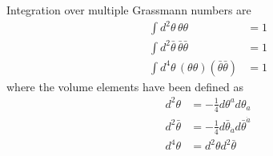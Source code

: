 Integration over multiple Grassmann numbers are
\begin{align}
    \int d^{2}\theta\,\theta\theta&=1
    \\
    \int d^{2}\bar{\theta}\,\bar{\theta}\bar{\theta}&=1
    \\
    \int d^{4}\theta\,(\theta\theta)(\bar{\theta}\bar{\theta})&=1
\end{align}
where the volume elements have been defined as
\begin{align}
    d^{2}\theta&=-\frac{1}{4}d\theta^{a}d\theta_{a}
    \\
    d^{2}\bar{\theta}&=-\frac{1}{4}d\bar{\theta}_{\dot{a}}d\bar{\theta}^{\dot{a}}
    \\
     d^{4}\theta&=d^{2}\theta d^{2}\bar{\theta}
\end{align}


